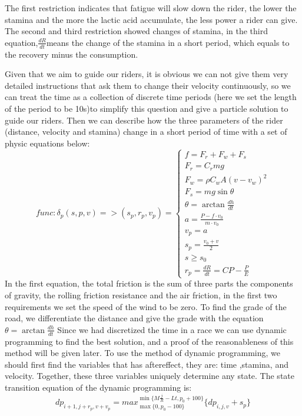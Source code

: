 \documentclass[12pt]{article}
\begin{document}
The first restriction indicates that fatigue will slow down the rider, the lower the stamina and the more the lactic acid accumulate, the less power a rider can give.
The second and third restriction showed changes of stamina, in the third equation,$\frac{d R}{d t}$means the change of the stamina in a short period, which equals to the
recovery minus the consumption.

Given that we aim to guide our riders, it is obvious we can not give them very detailed instructions that ask them to change their velocity continuously, so we can treat the time
as a collection of discrete time periods (here we set the length of the period to be 10s)to simplify this question and give a particle solution to guide our riders.
Then we can describe how the three parameters of the rider (distance, velocity and stamina) change in a short period of time with a set of physic equations below:
\begin{equation}
    func: \delta_p(s,p,v)=>(  s_p, r_p, v_p)=\left\{
    \begin{array}{c}
        f=F_r+F_w+F_s                     \\%
        F_r=C_rmg                         \\%
        F_w=\rho C_w A(v-v_w)^2           \\%
        F_s=mg\sin \theta                 \\
        \theta=\arctan\frac{d h}{d t}     \\%
        a=\frac{P-f\cdot v_0}{m\cdot v_0} \\
        v_p=a                             \\
        s_p=\frac{v_0+v}{2}               \\
        s\geqslant s_0                    \\
        r_p=\frac{d R}{d t} =CP-\frac{P}{E}
    \end{array}
    \right.
\end{equation}
In the first equation, the total friction is the sum of three parts the components of gravity, the rolling friction resistance and the air friction,
in the first two requirements we set the speed of the wind to be zero. To find the grade of the road, we differentiate the distance and give the grade with the equation
$\theta=\arctan\frac{d h}{d t}$
Since we had discretized the time in a race we can use dynamic programming to find the best solution,
and a proof of the reasonableness of this method will be given later.
To use the method of dynamic programming, we should first find the variables that has aftereffect, they are:  time ,stamina, and velocity. Together, these three variables
uniquely determine any state.
The state transition equation of the dynamic programming is:\begin{equation}dp_{i+1,j+r_p,v+v_p}= max_{\max\{0,p_0-100\}}^{\min\{M\frac{j}{R}-Lt,p_0+100\}}\{dp_{i,j,v}+s_p\}\end{equation}
\end{document}
